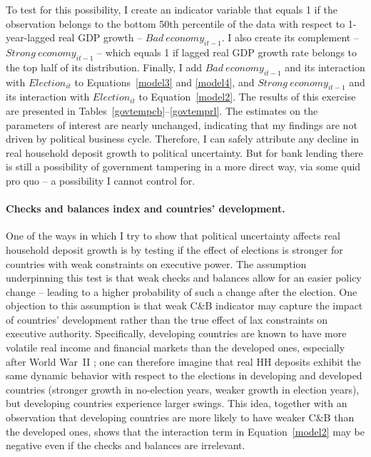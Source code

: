 \documentclass[12pt,a4paper]{article}
\begin{document}
To test for this possibility, I create an indicator variable that equals 1 if the observation belongs to the bottom 50th percentile of the data with respect to 1-year-lagged real GDP growth -- $Bad\ economy_{it-1}$. I also create its complement -- $Strong\ economy_{it-1}$ -- which equals 1 if lagged real GDP growth rate belongs to the top half of its distribution. Finally, I add $Bad\ economy_{it-1}$ and its interaction with $Election_{it}$ to Equations~\eqref{model3} and \eqref{model4}, and $Strong\ economy_{it-1}$ and its interaction with $Election_{it}$ to Equation~\eqref{model2}. The results of this exercise are presented in Tables~\ref{govtempcb}--\ref{govtemprl}. The estimates on the parameters of interest are nearly unchanged, indicating that my findings are not driven by political business cycle. Therefore, I can safely attribute any decline in real household deposit growth to political uncertainty. But for bank lending there is still a possibility of government tampering in a more direct way, via some quid pro quo -- a possibility I cannot control for.

\paragraph{Checks and balances index and countries' development.} One of the ways in which I try to show that political uncertainty affects real household deposit growth is by testing if the effect of elections is stronger for countries with weak constraints on executive power. The assumption underpinning this test is that weak checks and balances allow for an easier policy change -- leading to a higher probability of such a change after the election. One objection to this assumption is that weak C\&B indicator may capture the impact of countries' development rather than the true effect of lax constraints on executive authority. Specifically, developing countries are known to have more volatile real income and financial markets than the developed ones, especially after World War~II \citep{loayza2007macroeconomic, garcia2010real}; one can therefore imagine that real HH deposits exhibit the same dynamic behavior with respect to the elections in developing and developed countries (stronger growth in no-election years, weaker growth in election years), but developing countries experience larger swings. This idea, together with an observation that developing countries are more likely to have weaker C\&B than the developed ones, shows that the interaction term in Equation~\eqref{model2} may be negative even if the checks and balances are irrelevant.
\end{document}

